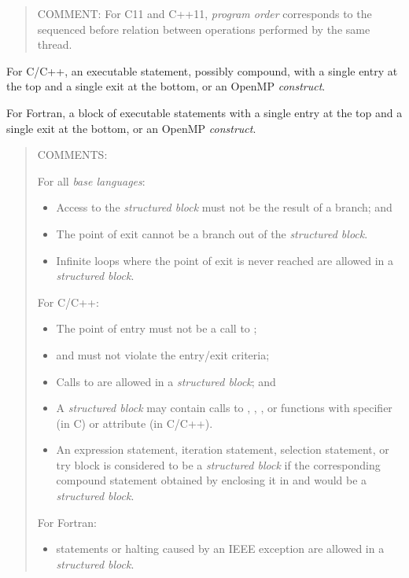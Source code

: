 \begin{quote}
COMMENT: For C11 and C++11, \emph{program order} corresponds to the sequenced
before relation between operations performed by the same thread.
\end{quote}
\glossarydefend

\glossarydefstart
For C/C++, an executable statement, possibly compound, with a single entry at the
top and a single exit at the bottom, or an OpenMP \emph{construct}.

For Fortran, a block of executable statements with a single entry at the top and a
single exit at the bottom, or an OpenMP \emph{construct}.

\begin{quote}
COMMENTS:

For all \emph{base languages}:

\begin{itemize}
\item Access to the \emph{structured block} must not be the result of a branch; and

\item The point of exit cannot be a branch out of the \emph{structured block}.

\item Infinite loops where the point of exit is never reached are
allowed in a \emph{structured block}.
\end{itemize}

For C/C++:

\begin{itemize}
\item The point of entry must not be a call to ;

\item {} and  must not violate the entry/exit criteria;

\item Calls to  are allowed in a \emph{structured block}; and

\item A \emph{structured block} may contain calls to ,
, ,  or functions
with  specifier (in C) or  attribute (in C/C++).
  
\item An expression statement, iteration statement, selection statement,
or try block is considered to be a \emph{structured block} if the
corresponding compound statement obtained by enclosing it in \tcode{\{}
and \tcode{\}} would be a \emph{structured block}.
\end{itemize}

For Fortran:

\begin{itemize}
\item {} statements or halting caused by an IEEE exception are allowed
in a \emph{structured block}.
\end{itemize}
\end{quote}
\glossarydefend

